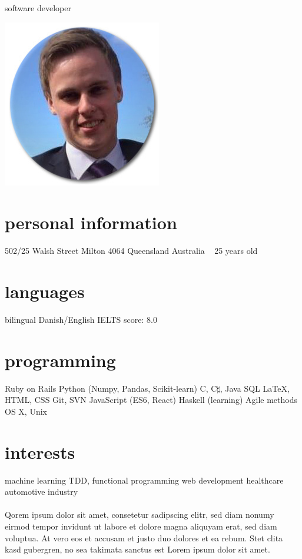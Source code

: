 \documentclass{friggeri-cv}
\begin{document}
{software developer}

\begin{aside}
  \includegraphics[scale=0.4]{img/meg2.jpg}
  ~
  \section{personal information}
    502/25 Walsh Street
    Milton 4064
    Queensland
    Australia
    ~
    25 years old
    ~
    ~
    ~
  \section{languages}
    bilingual Danish/English
    IELTS score: 8.0
  \section{programming}
    Ruby on Rails
    Python (Numpy, Pandas, Scikit-learn)
    C, C$\sharp$, Java
    SQL
    \LaTeX, HTML, CSS
    Git, SVN
    JavaScript (ES6, React)
    Haskell (learning)
    Agile methods
    OS X, Unix
  \section{interests}
    machine learning
    TDD, functional programming
    web development
    healthcare
    automotive industry
\end{aside}

\paragraph{}
Qorem ipsum dolor sit amet, consetetur sadipscing elitr, sed diam nonumy eirmod
tempor invidunt ut labore et dolore magna aliquyam erat, sed diam voluptua. At
vero eos et accusam et justo duo dolores et ea rebum. Stet clita kasd gubergren,
no sea takimata sanctus est Lorem ipsum dolor sit amet.
\end{document}
